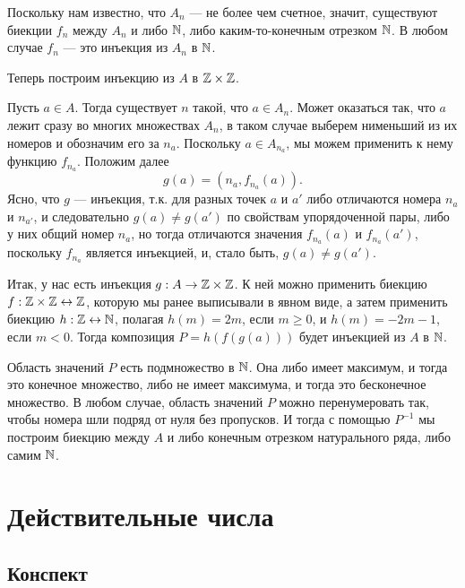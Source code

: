\begin{enumerate}
Поскольку нам известно, что $A_n$ --- не более чем счетное, значит, существуют биекции $f_n$ между $A_n$ и либо $\mathbb N$, либо каким-то-конечным отрезком $\mathbb N$. В любом случае $f_n$ --- это инъекция из $A_n$ в $\mathbb N$.

Теперь построим инъекцию из $A$ в $\mathbb Z\times\mathbb Z$.

Пусть $a\in A$. Тогда существует $n$ такой, что $a\in A_n$. Может оказаться так, что $a$ лежит сразу во многих множествах $A_n$, в таком случае выберем нименьший из их номеров и обозначим его за $n_a$. Поскольку $a\in A_{n_a}$, мы можем применить к нему функцию $f_{n_a}$. Положим далее
$$
g(a) = (n_a,f_{n_a}(a)).
$$
Ясно, что $g$ --- инъекция, т.к. для разных точек $a$ и $a'$ либо отличаются номера $n_a$ и $n_{a'}$, и следовательно $g(a)\ne g(a')$ по свойствам упорядоченной пары, либо у них общий номер $n_a$, но тогда отличаются значения $f_{n_a}(a)$ и $f_{n_a}(a')$, поскольку $f_{n_a}$ является инъекцией, и, стало быть, $g(a)\ne g(a')$.

Итак, у нас есть инъекция $g:A\to\mathbb Z\times\mathbb Z$. К ней можно применить биекцию $f:\mathbb Z\times\mathbb Z\leftrightarrow\mathbb Z$, которую мы ранее выписывали в явном виде, а затем применить биекцию $h:\mathbb Z\leftrightarrow\mathbb N$, полагая $h(m)=2m$, если $m\ge 0$, и $h(m)=-2m-1$, если $m<0$. Тогда композиция $P=h(f(g(a)))$ будет инъекцией из $A$ в $\mathbb N$.

Область значений $P$ есть подмножество в $\mathbb N$. Она либо имеет максимум, и тогда это конечное множество, либо не имеет максимума, и тогда это бесконечное множество. В любом случае, область значений $P$ можно перенумеровать так, чтобы номера шли подряд от нуля без пропусков. И тогда с помощью $P^{-1}$ мы построим биекцию между $A$ и либо конечным отрезком натурального ряда, либо самим $\mathbb N$.\epf

\end{enumerate}


\section{Действительные числа}

\subsection*{Конспект}

